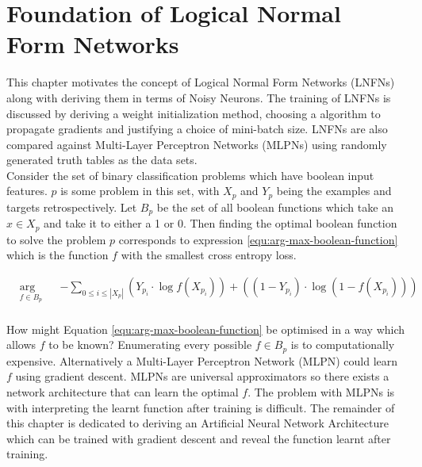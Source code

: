 \chapter{Foundation of Logical Normal Form Networks}\label{C:foundation-of-lnfns}
This chapter motivates the concept of Logical Normal Form Networks (LNFNs) along with deriving them in terms of Noisy Neurons. The training of LNFNs is discussed by deriving a weight initialization method, choosing a algorithm to propagate gradients and justifying a choice of mini-batch size. LNFNs are also compared against Multi-Layer Perceptron Networks (MLPNs) using randomly generated truth tables as the data sets.\\

Consider the set of binary classification problems which have boolean input features. $p$ is some problem in this set, with $X_p$ and $Y_p$ being the examples and targets retrospectively. Let $B_p$ be the set of all boolean functions which take an $x \in X_p$ and take it to either a 1 or 0. Then finding the optimal boolean function to solve the problem $p$ corresponds to expression \ref{equ:arg-max-boolean-function} which is the function $f$ with the smallest cross entropy loss.

\begin{equation}
\label{equ:arg-max-boolean-function}
\begin{aligned}
& \underset{f \in B_p}{\text{arg min}}
& & -\sum_{0 \leq i \leq |X_p|} (Y_{p_i} \cdot \log f(X_{p_i})) + ((1 - Y_{p_i}) \cdot \log(1 - f(X_{p_i})))  \\
\end{aligned}
\end{equation}

How might Equation \ref{equ:arg-max-boolean-function} be optimised in a way which allows $f$ to be known? Enumerating every possible $f \in B_p$ is to computationally expensive. Alternatively a Multi-Layer Perceptron Network (MLPN) could learn $f$ using gradient descent. MLPNs are universal approximators so there exists a network architecture that can learn the optimal $f$. The problem with MLPNs is with interpreting the learnt function after training is difficult. The remainder of this chapter is dedicated to deriving an Artificial Neural Network Architecture which can be trained with gradient descent and reveal the function learnt after training.\\

